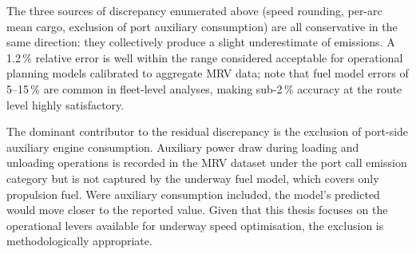 The three sources of discrepancy enumerated above (speed rounding, per-arc
mean cargo, exclusion of port auxiliary consumption) are all conservative in
the same direction: they collectively produce a slight underestimate of
emissions.  A 1.2\,\% relative error is well within the range considered
acceptable for operational planning models calibrated to aggregate MRV data;
\textcite{psaraftis2013speed} note that fuel model errors of 5--15\,\% are
common in fleet-level analyses, making sub-2\,\% accuracy at the route level
highly satisfactory.

The dominant contributor to the residual discrepancy is the exclusion of
port-side auxiliary engine consumption.  Auxiliary power draw during loading
and unloading operations is recorded in the MRV dataset under the port call
emission category but is not captured by the underway fuel model, which covers
only propulsion fuel.  Were auxiliary consumption included, the model's
predicted \CII{} would move closer to the reported value.  Given that this
thesis focuses on the operational levers available for underway speed
optimisation, the exclusion is methodologically appropriate.
